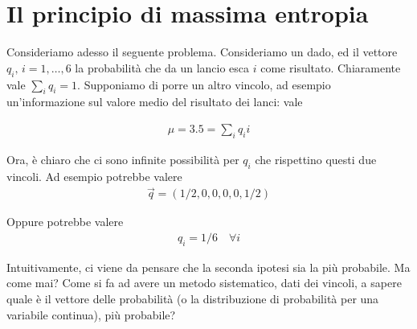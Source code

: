 \documentclass{report}
\begin{document}


\chapter{Il principio di massima entropia}

Consideriamo adesso il seguente problema. Consideriamo un dado, ed il vettore \(q_i, \, i = 1, \ldots, 6\) la probabilità che da un lancio esca \(i\) come risultato. Chiaramente vale \(\sum_i q_i = 1\). Supponiamo di porre un altro vincolo, ad esempio un'informazione sul valore medio del risultato dei lanci: vale 

\begin{align}
    \mu = 3.5 = \sum_i q_i i 
\end{align}

Ora, è chiaro che ci sono infinite possibilità per \(q_i\) che rispettino questi due vincoli. Ad esempio potrebbe valere 
\begin{align}
    \vec{q} = (1/2, 0, 0, 0, 0, 1/2)
\end{align}

Oppure potrebbe valere
\begin{align}
    q_i = 1/6 \quad \forall i
\end{align}

Intuitivamente, ci viene da pensare che la seconda ipotesi sia la più probabile. Ma come mai? Come si fa ad avere un metodo sistematico, dati dei vincoli, a sapere quale è il vettore delle probabilità (o la distribuzione di probabilità per una variabile continua), più probabile? \\
\end{document}
